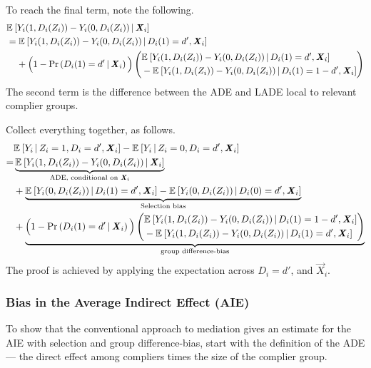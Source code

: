 To reach the final term, note the following.
\begin{align*}
    &\mathbb{E}_{} \left[ Y_i(1, D_i(Z_i)) - Y_i(0, D_i(Z_i)) \, \middle\vert \, \boldsymbol{\mathit{X}}_i \right] \\    
    &= \mathbb{E}_{} \left[ Y_i(1, D_i(Z_i)) - Y_i(0, D_i(Z_i)) \, \middle\vert \, D_i(1) = d', \boldsymbol{\mathit{X}}_i \right] \\
    &\;\;\;\;+ \Big(1 - \Pr\left( D_i(1) = d' \, \middle\vert \, \boldsymbol{\mathit{X}}_i \right)\Big)
    \left( \begin{aligned}
        &\mathbb{E}_{} \left[ Y_i(1, D_i(Z_i)) - Y_i(0, D_i(Z_i)) \, \middle\vert \, D_i(1) = d', \boldsymbol{\mathit{X}}_i \right] \\ 
        & - \mathbb{E}_{} \left[ Y_i(1, D_i(Z_i)) - Y_i(0, D_i(Z_i)) \, \middle\vert \, D_i(1) = 1 - d', \boldsymbol{\mathit{X}}_i \right]
    \end{aligned} \right) 
\end{align*}
The second term is the difference between the ADE and LADE local to relevant complier groups.

Collect everything together, as follows.
\begin{align*}
    &  \mathbb{E}_{} \left[ Y_i \, \middle\vert \, Z_i = 1, D_i = d', \boldsymbol{\mathit{X}}_i \right]
    - \mathbb{E}_{} \left[ Y_i \, \middle\vert \, Z_i = 0, D_i = d', \boldsymbol{\mathit{X}}_i \right] \\
    =& \underbrace{
        \mathbb{E}_{} \left[ Y_i(1, D_i(Z_i)) - Y_i(0, D_i(Z_i)) \, \middle\vert \, \boldsymbol{\mathit{X}}_i \right]}_{
            \text{ADE, conditional on }\boldsymbol{\mathit{X}}_i} \\
    &+ \underbrace{
        \mathbb{E}_{} \left[ Y_i(0, D_i(Z_i)) \, \middle\vert \, D_i(1) = d', \boldsymbol{\mathit{X}}_i \right]
            - \mathbb{E}_{} \left[ Y_i(0, D_i(Z_i)) \, \middle\vert \, D_i(0) = d', \boldsymbol{\mathit{X}}_i \right]}_{
                \text{Selection bias}} \\
    &+ \underbrace{\Big(1 - \Pr\left( D_i(1) = d' \, \middle\vert \, \boldsymbol{\mathit{X}}_i \right)\Big)
    \left( \begin{aligned}
        &\mathbb{E}_{} \left[ Y_i(1, D_i(Z_i)) - Y_i(0, D_i(Z_i)) \, \middle\vert \, D_i(1) = 1 - d', \boldsymbol{\mathit{X}}_i \right] \\ 
        & - \mathbb{E}_{} \left[ Y_i(1, D_i(Z_i)) - Y_i(0, D_i(Z_i)) \, \middle\vert \, D_i(1) = d', \boldsymbol{\mathit{X}}_i \right]
    \end{aligned} \right)}_{
        \text{group difference-bias}}
\end{align*}
The proof is achieved by applying the expectation across $D_i = d'$, and $\vec X_i$.

\subsubsection{Bias in the Average Indirect Effect (AIE)}
To show that the conventional approach to mediation gives an estimate for the AIE with selection and group difference-bias, start with the definition of the ADE --- the direct effect among compliers times the size of the complier group.

